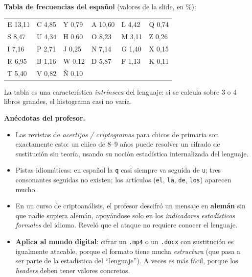 \documentclass[11pt,a4paper]{article}
\begin{document}
\begin{notebox}
\textbf{Tabla de frecuencias del español} (valores de la slide, en \%):
\begin{center}\ttfamily\footnotesize
\begin{tabular}{llllll}
E 13,11 & C 4,85 & Y 0,79 \qquad & A 10,60 & L 4,42 & Q 0,74\\
S 8,47  & U 4,34 & H 0,60 \qquad & O 8,23  & M 3,11 & Z 0,26\\
I 7,16  & P 2,71 & J 0,25 \qquad & N 7,14  & G 1,40 & X 0,15\\
R 6,95  & B 1,16 & W 0,12 \qquad & D 5,87  & F 1,13 & K 0,11\\
T 5,40  & V 0,82 & Ñ 0,10 \qquad &         &        &      \\
\end{tabular}
\end{center}
La tabla es una característica \emph{intrínseca} del lenguaje: si se calcula sobre 3 o 4 libros
grandes, el histograma casi no varía.
\end{notebox}

\begin{notebox}
\textbf{Anécdotas del profesor.}
\begin{itemize}[leftmargin=1.3em,itemsep=1pt]
  \item Las revistas de \emph{acertijos / criptogramas} para chicos de primaria son
        exactamente esto: un chico de 8--9 años puede resolver un cifrado de sustitución sin
        teoría, usando su noción estadística internalizada del lenguaje.
  \item Pistas idiomáticas: en español la \texttt{q} casi siempre va seguida de \texttt{u}; tres
        consonantes seguidas no existen; los artículos (\texttt{el}, \texttt{la}, \texttt{de},
        \texttt{los}) aparecen mucho.
  \item En un curso de criptoanálisis, el profesor descifró un mensaje en \textbf{alemán} sin
        que nadie supiera alemán, apoyándose solo en los \emph{indicadores estadísticos
        formales} del idioma. Reveló que el ataque no requiere conocer el lenguaje.
  \item \textbf{Aplica al mundo digital}: cifrar un \texttt{.mp4} o un \texttt{.docx} con
        sustitución es igualmente atacable, porque el formato tiene mucha \emph{estructura}
        (que pasa a ser parte de la estadística del ``lenguaje''). A veces es más fácil, porque
        los \emph{headers} deben tener valores concretos.
\end{itemize}
\end{notebox}
\end{document}
